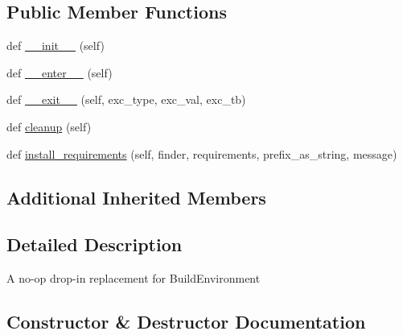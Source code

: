 \subsection*{Public Member Functions}
\begin{DoxyCompactItemize}
\item 
def \hyperlink{classpip_1_1__internal_1_1build__env_1_1NoOpBuildEnvironment_a76c5609721a013bc9faf6ae3630f8715}{\+\_\+\+\_\+init\+\_\+\+\_\+} (self)
\item 
def \hyperlink{classpip_1_1__internal_1_1build__env_1_1NoOpBuildEnvironment_a5e3edcb5f50408255681ef344123b5b7}{\+\_\+\+\_\+enter\+\_\+\+\_\+} (self)
\item 
def \hyperlink{classpip_1_1__internal_1_1build__env_1_1NoOpBuildEnvironment_a683c0774ece129a351c27ba5cdce65fd}{\+\_\+\+\_\+exit\+\_\+\+\_\+} (self, exc\+\_\+type, exc\+\_\+val, exc\+\_\+tb)
\item 
def \hyperlink{classpip_1_1__internal_1_1build__env_1_1NoOpBuildEnvironment_a5b1c56afdee653e307f70d1dc6df2d8b}{cleanup} (self)
\item 
def \hyperlink{classpip_1_1__internal_1_1build__env_1_1NoOpBuildEnvironment_aa2390b94b8eeb34ccf9d546b6e55419c}{install\+\_\+requirements} (self, finder, requirements, prefix\+\_\+as\+\_\+string, message)
\end{DoxyCompactItemize}
\subsection*{Additional Inherited Members}


\subsection{Detailed Description}
\begin{DoxyVerb}A no-op drop-in replacement for BuildEnvironment
\end{DoxyVerb}
 

\subsection{Constructor \& Destructor Documentation}
\mbox{\label{classpip_1_1__internal_1_1build__env_1_1NoOpBuildEnvironment_a76c5609721a013bc9faf6ae3630f8715}} 
